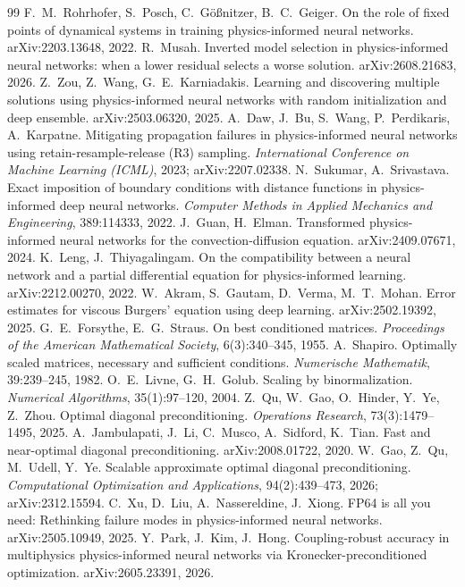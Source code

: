 \documentclass[fontset=windows,11pt]{ctexart}
\numberwithin{equation}{section}
\begin{document}
\begin{thebibliography}{99}
 F.~M.~Rohrhofer, S.~Posch, C.~G\"o{\ss}nitzer, B.~C.~Geiger. On the role of fixed points of dynamical systems in training physics-informed neural networks. arXiv:2203.13648, 2022.
 R.~Musah. Inverted model selection in physics-informed neural networks: when a lower residual selects a worse solution. arXiv:2608.21683, 2026.
 Z.~Zou, Z.~Wang, G.~E.~Karniadakis. Learning and discovering multiple solutions using physics-informed neural networks with random initialization and deep ensemble. arXiv:2503.06320, 2025.
 A.~Daw, J.~Bu, S.~Wang, P.~Perdikaris, A.~Karpatne. Mitigating propagation failures in physics-informed neural networks using retain-resample-release (R3) sampling. \emph{International Conference on Machine Learning (ICML)}, 2023; arXiv:2207.02338.
 N.~Sukumar, A.~Srivastava. Exact imposition of boundary conditions with distance functions in physics-informed deep neural networks. \emph{Computer Methods in Applied Mechanics and Engineering}, 389:114333, 2022.
 J.~Guan, H.~Elman. Transformed physics-informed neural networks for the convection-diffusion equation. arXiv:2409.07671, 2024.
 K.~Leng, J.~Thiyagalingam. On the compatibility between a neural network and a partial differential equation for physics-informed learning. arXiv:2212.00270, 2022.
 W.~Akram, S.~Gautam, D.~Verma, M.~T.~Mohan. Error estimates for viscous Burgers' equation using deep learning. arXiv:2502.19392, 2025.
 G.~E.~Forsythe, E.~G.~Straus. On best conditioned matrices. \emph{Proceedings of the American Mathematical Society}, 6(3):340--345, 1955.
 A.~Shapiro. Optimally scaled matrices, necessary and sufficient conditions. \emph{Numerische Mathematik}, 39:239--245, 1982.
 O.~E.~Livne, G.~H.~Golub. Scaling by binormalization. \emph{Numerical Algorithms}, 35(1):97--120, 2004.
 Z.~Qu, W.~Gao, O.~Hinder, Y.~Ye, Z.~Zhou. Optimal diagonal preconditioning. \emph{Operations Research}, 73(3):1479--1495, 2025.
 A.~Jambulapati, J.~Li, C.~Musco, A.~Sidford, K.~Tian. Fast and near-optimal diagonal preconditioning. arXiv:2008.01722, 2020.
 W.~Gao, Z.~Qu, M.~Udell, Y.~Ye. Scalable approximate optimal diagonal preconditioning. \emph{Computational Optimization and Applications}, 94(2):439--473, 2026; arXiv:2312.15594.
 C.~Xu, D.~Liu, A.~Nassereldine, J.~Xiong. FP64 is all you need: Rethinking failure modes in physics-informed neural networks. arXiv:2505.10949, 2025.
 Y.~Park, J.~Kim, J.~Hong. Coupling-robust accuracy in multiphysics physics-informed neural networks via Kronecker-preconditioned optimization. arXiv:2605.23391, 2026.
\end{thebibliography}
\appendix
\end{document}
